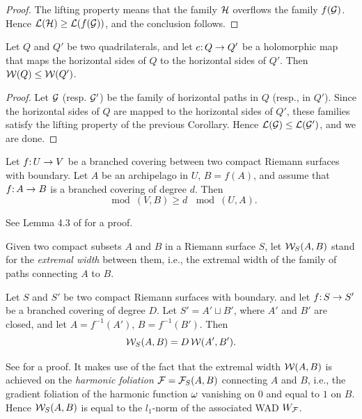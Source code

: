 \begin{proof}
   The lifting property means that the family ${\mathcal H}$
overflows the family $f({\mathcal G})$. Hence ${\mathcal L}({\mathcal H})\geq {\mathcal L}(f({\mathcal G}))$,
and the conclusion follows.
\end{proof}

\begin{cor}\label{Q}
  Let $Q$ and $Q'$ be two quadrilaterals,
and let $e\mathpunct: Q\to Q'$ be a holomorphic map that maps the horizontal sides of $Q$ to the horizontal sides of $Q'$.
Then ${\mathcal W}(Q)\leq {\mathcal W}(Q')$.
\end{cor}

\begin{proof}
  Let ${\mathcal G}$ (resp. ${\mathcal G}'$) be the family of horizontal paths in $Q$ (resp., in $Q'$).
 Since the horizontal sides of $Q$ are mapped to the horizontal sides of $Q'$,
these families satisfy the lifting property of the previous Corollary.
Hence ${\mathcal L}({\mathcal G})\leq {\mathcal L}({\mathcal G}')$, and we are done.
\end{proof}

\begin{lem}\label{modulus transform-2}
 Let $f\mathpunct: U\to V$ be a branched covering between two compact Riemann surfaces with boundary.
Let $A$ be an archipelago in $U$,  $B=f(A)$, and
assume that  $f\mathpunct:  A\to B$ is a branched covering of degree $d$. Then
$$
      \mod(V, B) \geq d\, \mod (U,  A).
$$
\end{lem}

See Lemma 4.3 of \cite{covering lemma} for a proof.


Given two compact subsets $A$ and $B$ in a Riemann surface $S$,
let ${\mathcal W}_S (A,B)$ stand for the {\it extremal width}
between them, i.e., the extremal width of the family of paths connecting $A$ to $B$.

\begin{lem}\label{modulus transform-1}
Let $S$ and $S'$ be two compact Riemann surfaces with boundary.
and let  $f\mathpunct: S\to S'$ be a branched covering of degree $D$.
Let $S'=A'\sqcup B'$, where $A'$ and $B'$ are closed,
and let  $A=f^{-1}(A')$, $B=f^{-1}(B')$.
Then
$$
      {\mathcal W}_S(A, B)= D \, {\mathcal W} (A', B').
$$
\end{lem}

See \cite{A} for a proof.
It makes use of the fact that
the extremal width ${\mathcal W}(A,B)$ is achieved on the {\it harmonic foliation} ${\mathcal F}={\mathcal F}_S(A,B)$ connecting $A$ and $B$,
i.e.,  the gradient foliation of the harmonic function ${\omega}$ vanishing on $0$ and equal to $1$ on $B$.
Hence ${\mathcal W}_S(A,B)$ is equal to the $l_1$-norm of the associated  WAD $W_{\mathcal F}$.

